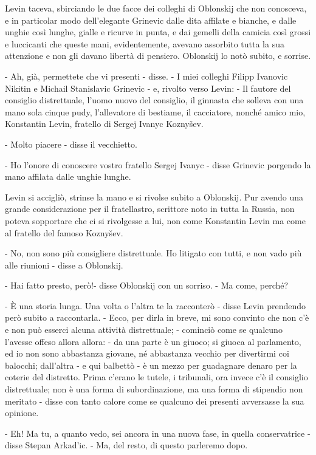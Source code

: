 Levin taceva, sbirciando le due facce dei colleghi di Oblonskij che non conosceva, e in particolar modo dell'elegante Grinevic dalle dita affilate e bianche, e dalle unghie così lunghe, gialle e ricurve in punta, e dai gemelli della camicia così grossi e luccicanti che queste mani, evidentemente, avevano assorbito tutta la sua attenzione e non gli davano libertà di pensiero. Oblonskij lo notò subito, e sorrise. 

- Ah, già, permettete che vi presenti - disse. - I miei colleghi Filipp Ivanovic Nikitin e Michail Stanislavic Grinevic - e, rivolto verso Levin: - Il fautore del consiglio distrettuale, l'uomo nuovo del consiglio, il ginnasta che solleva con una mano sola cinque pudy, l'allevatore di bestiame, il cacciatore, nonché amico mio, Konstantin Levin, fratello di Sergej Ivanyc Koznyšev. 

- Molto piacere - disse il vecchietto. 

- Ho l'onore di conoscere vostro fratello Sergej Ivanyc - disse Grinevic porgendo la mano affilata dalle unghie lunghe. 

Levin si accigliò, strinse la mano e si rivolse subito a Oblonskij. Pur avendo una grande considerazione per il fratellastro, scrittore noto in tutta la Russia, non poteva sopportare che ci si rivolgesse a lui, non come Konstantin Levin ma come al fratello del famoso Koznyšev. 

- No, non sono più consigliere distrettuale. Ho litigato con tutti, e non vado più alle riunioni - disse a Oblonskij. 

- Hai fatto presto, però!- disse Oblonskij con un sorriso. - Ma come, perché? 

- È una storia lunga. Una volta o l'altra te la racconterò - disse Levin prendendo però subito a raccontarla. - Ecco, per dirla in breve, mi sono convinto che non c'è e non può esserci alcuna attività distrettuale; - cominciò come se qualcuno l'avesse offeso allora allora: - da una parte è un giuoco; si giuoca al parlamento, ed io non sono abbastanza giovane, né abbastanza vecchio per divertirmi coi balocchi; dall'altra - e qui balbettò - è un mezzo per guadagnare denaro per la coterie del distretto. Prima c'erano le tutele, i tribunali, ora invece c'è il consiglio distrettuale; non è una forma di subordinazione, ma una forma di stipendio non meritato - disse con tanto calore come se qualcuno dei presenti avversasse la sua opinione. 

- Eh! Ma tu, a quanto vedo, sei ancora in una nuova fase, in quella conservatrice - disse Stepan Arkad'ic. - Ma, del resto, di questo parleremo dopo. 

